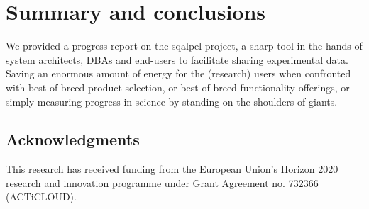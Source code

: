 \documentclass{cidr-2019}
\begin{document}
\section{Summary and conclusions}\label{Summary and conclusions}

We provided a progress report on the {\sc sqalpel} project, a sharp
tool in the hands of system architects, DBAs and end-users to
facilitate sharing experimental data.
Saving an enormous amount of energy for the (research) users when
confronted with best-of-breed product selection, or best-of-breed
functionality offerings, or simply measuring progress in science by
standing on the shoulders of giants.







\subsection*{Acknowledgments} This research has received funding from the European Union's Horizon 2020 research and innovation programme under Grant Agreement no. 732366 (ACTiCLOUD).

{\small   }
\end{document}
